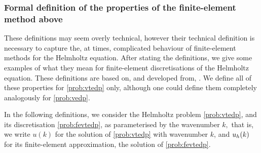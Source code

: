 





\subsubsection{Formal definition of the properties of the finite-element method above}\label{sec:femprops}

These definitions may seem overly technical, however their technical definition is necessary to capture the, at times, complicated behaviour of finite-element methods for the Helmholtz equation. After stating the definitions, we give some examples of what they mean for finite-element discretisations of the Helmholtz equation. These definitions are based on, and developed from, \cite[Definition 2.3]{DiMoSp:19}. We define all of these properties for \cref{prob:vtedp} only, although one could define them completely analogously for \cref{prob:vedp}.

In the following definitions, we consider the Helmholtz problem \cref{prob:vtedp}, and its discretisation \cref{prob:fevtedp}, as parameterised by the wavenumber $k,$ that is, we write $u(k)$ for the solution of \cref{prob:vtedp} with wavenumber $k$, and $u_{h}(k)$ for its finite-element approximation, the solution of \cref{prob:fevtedp}.

